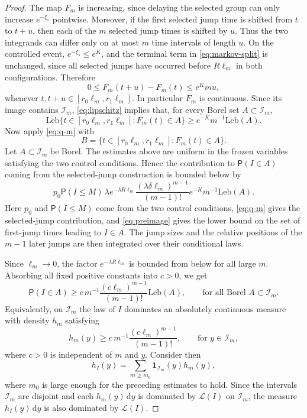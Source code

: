 \documentclass[11pt]{article}
\newcommand{\Prob}{\mathsf P}
\newcommand{\1}{\mathbf 1}
\newcommand{\law}{\mathcal L}
\newcommand{\dd}{\mathrm d}
\begin{document}
\begin{proof}
The map $F_m$ is increasing, since delaying the selected group can only increase $e^{-\xi_s}$ pointwise. Moreover, if the first selected jump time is shifted from $t$ to $t+u$, then each of the $m$ selected jump times is shifted by $u$. Thus the two integrands can differ only on at most $m$ time intervals of length $u$. On the controlled event, $e^{-\xi_s}\leq e^K$, and the terminal term in \eqref{eq:markov-split} is unchanged, since all selected jumps have occurred before $R\ell_m$ in both configurations. Therefore
\begin{equation}\label{eq:lipschitz}
 0\leq F_m(t+u)-F_m(t)\leq e^Kmu,
\end{equation}
whenever $t,t+u\in[r_0\ell_m,r_1\ell_m]$.
In particular $F_m$ is continuous. Since its image contains $\mathcal I_m$, \eqref{eq:lipschitz} implies that, for every Borel set $A\subset\mathcal I_m$,
\begin{equation}\label{eq:preimage}
 \mathrm{Leb}\{t\in[r_0\ell_m,r_1\ell_m]:F_m(t)\in A\}
 \geq
 e^{-K}m^{-1}\mathrm{Leb}(A).
\end{equation}
Now apply \eqref{eq:q-m} with
\[
 B=\{t\in[r_0\ell_m,r_1\ell_m]:F_m(t)\in A\}.
\]
Let $A\subset \mathcal I_m$ be Borel. The estimates above are uniform in the frozen variables satisfying the two control conditions. Hence the contribution to $\Prob(I\in A)$ coming from the selected-jump construction is bounded below by
\[
 p_0\Prob(I\leq M)\,
 \lambda e^{-\lambda R\ell_m}
 \frac{(\lambda\delta\ell_m)^{m-1}}{(m-1)!}
 e^{-K}m^{-1}\mathrm{Leb}(A).
\]
Here $p_0$ and $\Prob(I\leq M)$ come from the two control conditions, \eqref{eq:q-m} gives the selected-jump contribution, and \eqref{eq:preimage} gives the lower bound on the set of first-jump times leading to $I\in A$. The jump sizes and the relative positions of the $m-1$ later jumps are then integrated over their conditional laws.

Since $\ell_m\to0$, the factor $e^{-\lambda R\ell_m}$ is bounded from below for all large $m$. Absorbing all fixed positive constants into $c>0$, we get
\[
 \Prob(I\in A)
 \geq
 c\,m^{-1}\frac{(c\ell_m)^{m-1}}{(m-1)!}\mathrm{Leb}(A),
 \qquad
 \text{for all Borel }A\subset\mathcal I_m.
\]
Equivalently, on $\mathcal I_m$ the law of $I$ dominates an absolutely continuous measure with density $h_m$ satisfying
\begin{equation}\label{eq:hm-lower}
 h_m(y)\geq c\,m^{-1}\frac{(c\ell_m)^{m-1}}{(m-1)!},
 \qquad
 \text{for }y\in\mathcal I_m,
\end{equation}
where $c>0$ is independent of $m$ and $y$.
Consider then
\[
 h_I(y)=\sum_{m\geq m_0}\1_{\mathcal I_m}(y)h_m(y),
\]
where $m_0$ is large enough for the preceding estimates to hold. Since the intervals $\mathcal I_m$ are disjoint and each $h_m(y)\,\dd y$ is dominated by $\law(I)$ on $\mathcal I_m$, the measure $h_I(y)\,\dd y$ is also dominated by $\law(I)$.


\end{proof}
\end{document}
